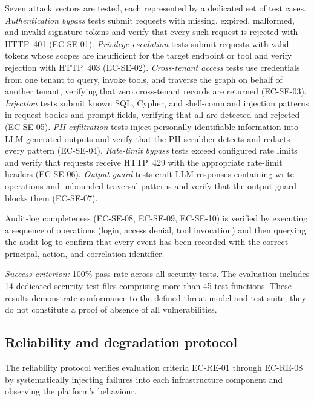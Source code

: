 \documentclass[a4paper,noexaminfo]{sapthesis}
\begin{document}
Seven attack vectors are tested, each represented by a dedicated set
of test cases.  \emph{Authentication bypass} tests submit requests with
missing, expired, malformed, and invalid-signature tokens and verify that
every such request is rejected with HTTP~401 (EC-SE-01).
\emph{Privilege escalation} tests submit requests with valid tokens whose
scopes are insufficient for the target endpoint or tool and verify
rejection with HTTP~403 (EC-SE-02).  \emph{Cross-tenant access} tests
use credentials from one tenant to query, invoke tools, and traverse the
graph on behalf of another tenant, verifying that zero cross-tenant
records are returned (EC-SE-03).  \emph{Injection} tests submit known SQL,
Cypher, and shell-command injection patterns in request bodies and prompt
fields, verifying that all are detected and rejected (EC-SE-05).
\emph{PII exfiltration} tests inject personally identifiable information
into LLM-generated outputs and verify that the PII scrubber detects and
redacts every pattern (EC-SE-04).  \emph{Rate-limit bypass} tests exceed
configured rate limits and verify that requests receive HTTP~429 with the
appropriate rate-limit headers (EC-SE-06).  \emph{Output-guard} tests
craft LLM responses containing write operations and unbounded traversal
patterns and verify that the output guard blocks them (EC-SE-07).

Audit-log completeness (EC-SE-08, EC-SE-09, EC-SE-10) is verified by
executing a sequence of operations (login, access denial, tool
invocation) and then querying the audit log to confirm that every event
has been recorded with the correct principal, action, and correlation
identifier.

\medskip
\noindent\emph{Success criterion:} 100\% pass rate across all security
tests.  The evaluation includes 14 dedicated security test files
comprising more than 45 test functions.  These results demonstrate
conformance to the defined threat model and test suite; they do not
constitute a proof of absence of all vulnerabilities.

\subsection{Reliability and degradation protocol}
\label{sec:reliability-protocol}

The reliability protocol verifies evaluation criteria EC-RE-01 through
EC-RE-08 by systematically injecting failures into each infrastructure
component and observing the platform's behaviour.
\end{document}
